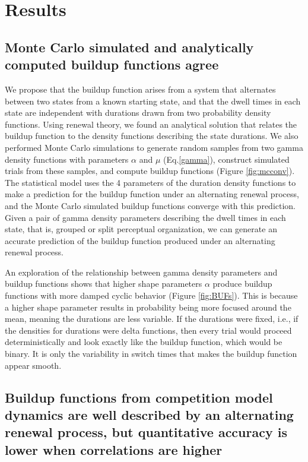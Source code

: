 \section{Results}

\subsection{Monte Carlo simulated and analytically computed buildup functions agree}

We propose that the buildup function arises from a system that alternates between two states from a known starting state, and that the dwell times in each state are independent with durations drawn from two probability density functions. Using renewal theory, we found an analytical solution that relates the buildup function to the density functions describing the state durations. We also performed Monte Carlo simulations to generate random samples from two gamma density functions with parameters $\alpha$ and $\mu$ (Eq.\ref{gamma}), construct simulated trials from these samples, and compute buildup functions (Figure \ref{fig:mcconv}). The statistical model uses the 4 parameters of the duration density functions to make a prediction for the buildup function under an alternating renewal process, and the Monte Carlo simulated buildup functions converge with this prediction. Given a pair of gamma density parameters describing the dwell times in each state, that is, grouped or split perceptual organization, we can generate an accurate prediction of the buildup function produced under an alternating renewal process.

An exploration of the relationship between gamma density parameters and buildup functions shows that higher shape parameters $\alpha$ produce buildup functions with more damped cyclic behavior (Figure \ref{fig:BUFs}). This is because a higher shape parameter results in probability being more focused around the mean, meaning the durations are less variable. If the durations were fixed, i.e., if the densities for durations were delta functions, then every trial would proceed deterministically and look exactly like the buildup function, which would be binary. It is only the variability in switch times that makes the buildup function appear smooth. 

\subsection{Buildup functions from competition model dynamics are well described by an alternating renewal process, but quantitative accuracy is lower when correlations are higher}

